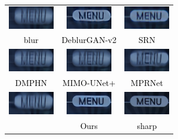 \begin{sloppypar}
\begin{figure}
        \center
        \scriptsize
        \begin{tabular}{ccc}
                \includegraphics[width=2cm]{./compare_image/blur.png} &    \includegraphics[width=2cm]{./compare_image/DG2.png} &    \includegraphics[width=2cm]{./compare_image/SRN.png}       \\
                \textcolor{black}{blur} & \textcolor{black}{DeblurGAN-v2} & \textcolor{black}{SRN} \\
                
                \includegraphics[width=2cm]{./compare_image/DMPHN.png} &    \includegraphics[width=2cm]{./compare_image/MIMO.png} &    \includegraphics[width=2cm]{./compare_image/MPR.png}       \\
                \textcolor{black}{DMPHN} & \textcolor{black}{MIMO-UNet+} & \textcolor{black}{MPRNet} \\
                
                \includegraphics[width=2cm]{./compare_image/blur_AD.png} & 
                \includegraphics[width=2cm]{./compare_image/ours.png} &    \includegraphics[width=2cm]{./compare_image/GT.png}       \\
                \textcolor{black}{\cite{26}} & \textcolor{black}{Ours} & \textcolor{black}{sharp}
                

\end{tabular}
\end{figure}
\end{sloppypar}
